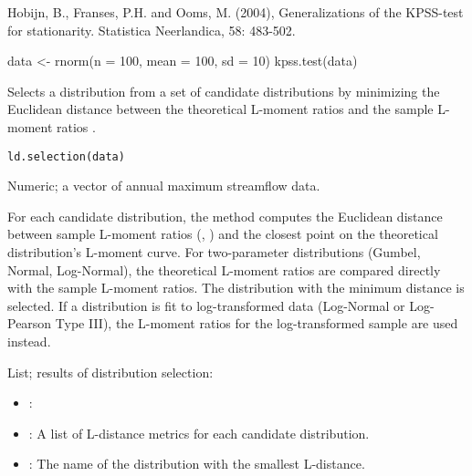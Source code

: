 \documentclass[a4paper]{book}
\begin{document}
%
\begin{References}
Hobijn, B., Franses, P.H. and Ooms, M. (2004), Generalizations of the KPSS-test for
stationarity. Statistica Neerlandica, 58: 483-502.
\end{References}
%
\begin{SeeAlso}
\end{SeeAlso}
%
\begin{Examples}
\begin{ExampleCode}
data <- rnorm(n = 100, mean = 100, sd = 10)
kpss.test(data)

\end{ExampleCode}
\end{Examples}
%
\begin{Description}
Selects a distribution from a set of candidate distributions by minimizing the
Euclidean distance between the theoretical L-moment ratios 
and the sample L-moment ratios .
\end{Description}
%
\begin{Usage}
\begin{verbatim}
ld.selection(data)
\end{verbatim}
\end{Usage}
%
\begin{Arguments}
\begin{ldescription}
\item[\code{data}] Numeric; a vector of annual maximum streamflow data.
\end{ldescription}
\end{Arguments}
%
\begin{Details}
For each candidate distribution, the method computes the Euclidean distance between
sample L-moment ratios (, ) and the closest point on the
theoretical distribution's L-moment curve. For two-parameter distributions (Gumbel,
Normal, Log-Normal), the theoretical L-moment ratios are compared directly with
the sample L-moment ratios. The distribution with the minimum distance is selected.
If a distribution is fit to log-transformed data (Log-Normal or Log-Pearson Type III),
the L-moment ratios for the log-transformed sample are used instead.
\end{Details}
%
\begin{Value}
List; results of distribution selection:
\begin{itemize}

\item{} : 
\item{} : A list of L-distance metrics for each candidate distribution.
\item{} : The name of the distribution with the smallest L-distance.

\end{itemize}

\end{Value}
\end{document}
